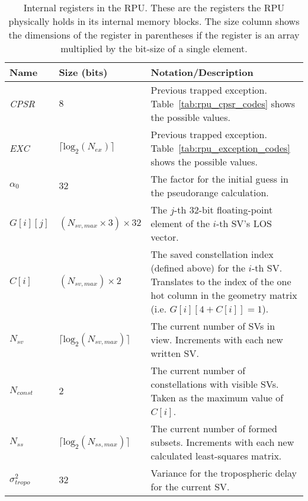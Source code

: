 \documentclass[11pt]{article}
\begin{document}
\begin{table}[htbp] \begin{center}
  \caption{Internal registers in the RPU. These are the registers the RPU physically holds in its internal memory blocks. The size column shows the dimensions of the register in parentheses if the register is an array multiplied by the bit-size of a single element.}
  \label{tab:rpu_internal_registers}
  \begin{tabular}{|m{1.5cm}|m{2.5cm}|m{7cm}|}
    \hline

    \textbf{Name} & \textbf{Size (bits)} & \textbf{Notation/Description}\\ \hline

    \emph{CPSR} & $8$ & Previous trapped exception. Table~\ref{tab:rpu_cpsr_codes} shows the possible values.\\ \hline

    \emph{EXC} & $\lceil{\text{log}_2(N_{ex})}\rceil$ & Previous trapped exception. Table~\ref{tab:rpu_exception_codes} shows the possible values.\\ \hline

    $\alpha_0$ & $32$ & The factor for the initial guess in the pseudorange calculation.\\ \hline

    $G[i][j]$ & $(N_{sv,max} \times 3) \times 32$ & The $j$-th 32-bit floating-point element of the $i$-th SV's LOS vector.\\ \hline

    $C[i]$ & $(N_{sv,max}) \times 2$ & The saved constellation index (defined above) for the $i$-th SV. Translates to the index of the one hot column in the geometry matrix (i.e. $G[i][4+C[i]]=1$).\\ \hline

    $N_{sv}$ & $\lceil{\text{log}_2(N_{sv,max})}\rceil$ & The current number of SVs in view. Increments with each new written SV.\\ \hline

    $N_{const}$ & $2$ & The current number of constellations with visible SVs. Taken as the maximum value of $C[i]$.\\ \hline

    $N_{ss}$ & $\lceil{\text{log}_2(N_{ss,max})}\rceil$ & The current number of formed subsets. Increments with each new calculated least-squares matrix.\\ \hline

    $\sigma_{tropo}^2$ & $32$ & Variance for the tropospheric delay for the current SV.\\ \hline


\end{tabular}
\end{center}
\end{table}
\end{document}
